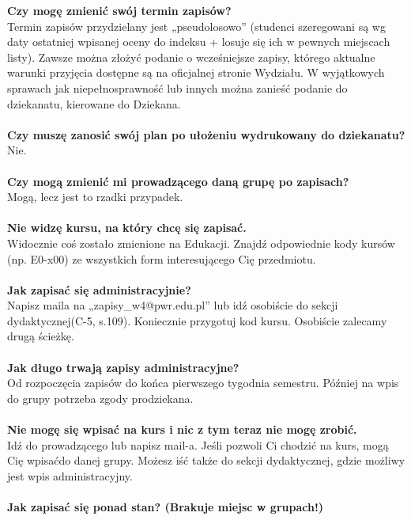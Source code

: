 \documentclass[11pt]{article}
\begin{document}
\newpage
\noindent \textbf{Czy mogę zmienić swój termin zapisów?}\\
\indent Termin zapisów przydzielany jest „pseudolosowo” (studenci szeregowani są wg daty ostatniej wpisanej oceny do indeksu + losuje się ich w pewnych miejscach listy). Zawsze można złożyć podanie o wcześniejsze zapisy, którego aktualne warunki przyjęcia dostępne są na oficjalnej stronie Wydziału. W wyjątkowych sprawach jak niepełnosprawność lub innych można zanieść podanie do dziekanatu, kierowane do Dziekana.\\\\
\textbf{Czy muszę zanosić swój plan po ułożeniu wydrukowany do dziekanatu?}\\
\indent Nie.\\\\
\textbf{Czy mogą zmienić mi prowadzącego daną grupę po zapisach?}\\
\indent Mogą, lecz jest to rzadki przypadek.\\\\
\textbf{Nie widzę kursu, na który chcę się zapisać.}\\
\indent Widocznie coś zostało zmienione na Edukacji. Znajdź odpowiednie kody kursów \linebreak(np. E0-x00) ze wszystkich form interesującego Cię przedmiotu.\\\\
\textbf{Jak zapisać się administracyjnie?}\\
\indent Napisz maila na „zapisy\_w4@pwr.edu.pl” lub idź osobiście do sekcji dydaktycznej\linebreak (C-5, s.109). Koniecznie przygotuj kod kursu. Osobiście zalecamy drugą ścieżkę.\\\\
\noindent \textbf{Jak długo trwają zapisy administracyjne?}\\
\indent Od rozpoczęcia zapisów do końca pierwszego tygodnia semestru. Później na wpis do grupy potrzeba zgody prodziekana.\\\\
\textbf{Nie mogę się wpisać na kurs i nic z tym teraz nie mogę zrobić.}\\
\indent Idź do prowadzącego lub napisz mail-a. Jeśli pozwoli Ci chodzić na kurs, mogą Cię wpisać\linebreak do danej grupy. Możesz iść także do sekcji dydaktycznej, gdzie możliwy jest wpis administracyjny.\\\\
\noindent \textbf{Jak zapisać się ponad stan? (Brakuje miejsc w grupach!)}\\
\end{document}

